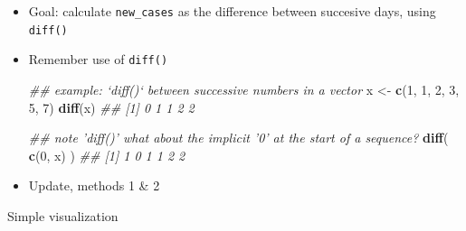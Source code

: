 \documentclass[]{book}
\newenvironment{Shaded}{\begin{snugshade}}{\end{snugshade}}
\newcommand{\CommentTok}[1]{\textcolor[rgb]{0.56,0.35,0.01}{\textit{#1}}}
\newcommand{\DecValTok}[1]{\textcolor[rgb]{0.00,0.00,0.81}{#1}}
\newcommand{\KeywordTok}[1]{\textcolor[rgb]{0.13,0.29,0.53}{\textbf{#1}}}
\newcommand{\NormalTok}[1]{#1}
\newcommand{\OperatorTok}[1]{\textcolor[rgb]{0.81,0.36,0.00}{\textbf{#1}}}
\newcommand{\StringTok}[1]{\textcolor[rgb]{0.31,0.60,0.02}{#1}}
\begin{document}
\begin{itemize}
\item
  Goal: calculate \texttt{new\_cases} as the difference between succesive days, using \texttt{diff()}
\item
  Remember use of \texttt{diff()}

\begin{Shaded}
\begin{Highlighting}[]
\CommentTok{## example: `diff()` between successive numbers in a vector}
\NormalTok{x <-}\StringTok{ }\KeywordTok{c}\NormalTok{(}\DecValTok{1}\NormalTok{, }\DecValTok{1}\NormalTok{, }\DecValTok{2}\NormalTok{, }\DecValTok{3}\NormalTok{, }\DecValTok{5}\NormalTok{, }\DecValTok{7}\NormalTok{)}
\KeywordTok{diff}\NormalTok{(x)}
\CommentTok{## [1] 0 1 1 2 2}

\CommentTok{## note 'diff()' what about the implicit '0' at the start of a sequence?}
\KeywordTok{diff}\NormalTok{( }\KeywordTok{c}\NormalTok{(}\DecValTok{0}\NormalTok{, x) )}
\CommentTok{## [1] 1 0 1 1 2 2}
\end{Highlighting}
\end{Shaded}
\item
  Update, methods 1 \& 2

\begin{Shaded}
\end{Shaded}
\end{itemize}

Simple visualization
\end{document}
